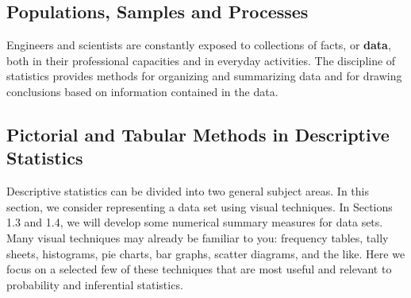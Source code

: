 \documentclass[]{book}
\begin{document}
\subsection{Populations, Samples and Processes}
Engineers and scientists are constantly exposed to collections of facts, or \textbf{data}, both in their professional capacities and in everyday activities. The discipline of statistics provides methods for organizing and summarizing data and for drawing conclusions based on information contained in the data.

\subsection{Pictorial and Tabular Methods in Descriptive Statistics}
Descriptive statistics can be divided into two general subject areas. In this section, we consider representing a data set using visual techniques. In Sections 1.3 and 1.4, we will develop some numerical summary measures for data sets. Many visual techniques may already be familiar to you: frequency tables, tally sheets, histograms, pie charts, bar graphs, scatter diagrams, and the like. Here we focus on a selected few of these techniques that are most useful and relevant to probability and inferential statistics.
\end{document}
